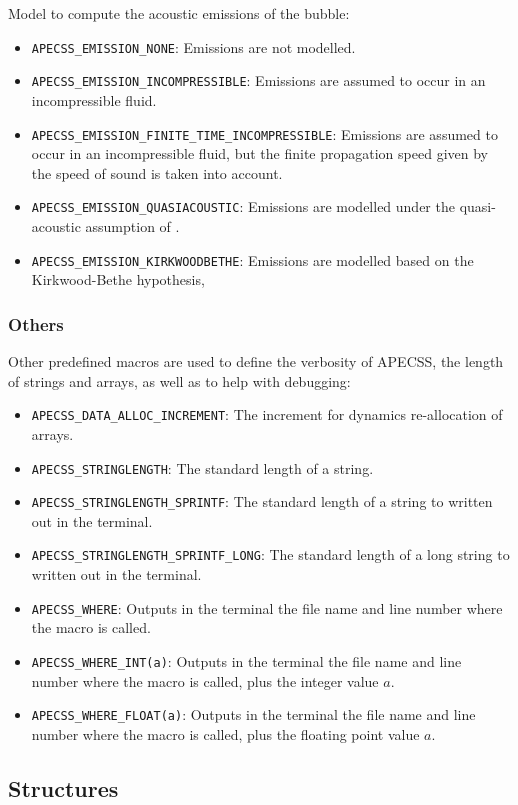 Model to compute the acoustic emissions of the bubble:\vspace{-1em}
\begin{itemize}[noitemsep]
  \item {\tt APECSS\_EMISSION\_NONE}: Emissions are not modelled.
  \item {\tt APECSS\_EMISSION\_INCOMPRESSIBLE}: Emissions are assumed to occur in an incompressible fluid.
  \item {\tt APECSS\_EMISSION\_FINITE\_TIME\_INCOMPRESSIBLE}: Emissions are assumed to occur in an incompressible fluid, but the finite propagation speed given by the speed of sound is taken into account.
  \item {\tt APECSS\_EMISSION\_QUASIACOUSTIC}: Emissions are modelled under the quasi-acoustic assumption of \citet{Gilmore1952}.
  \item {\tt APECSS\_EMISSION\_KIRKWOODBETHE}: Emissions are modelled based on the Kirkwood-Bethe hypothesis,
\end{itemize}


\subsubsection{Others}

Other predefined macros are used to define the verbosity of APECSS, the length of strings and arrays, as well as to help with debugging:\vspace{-1em}
\begin{itemize}[noitemsep]
  \item {\tt APECSS\_DATA\_ALLOC\_INCREMENT}: The increment for dynamics re-allocation of arrays.
  \item {\tt APECSS\_STRINGLENGTH}: The standard length of a string.
  \item {\tt APECSS\_STRINGLENGTH\_SPRINTF}: The standard length of a string to written out in the terminal.
  \item {\tt APECSS\_STRINGLENGTH\_SPRINTF\_LONG}: The standard length of a long string to written out in the terminal.
  \item {\tt APECSS\_WHERE}: Outputs in the terminal the file name and line number where the macro is called.
  \item {\tt APECSS\_WHERE\_INT(a)}: Outputs in the terminal the file name and line number where the macro is called, plus the integer value $a$.
  \item {\tt APECSS\_WHERE\_FLOAT(a)}: Outputs in the terminal the file name and line number where the macro is called, plus the floating point value $a$.
\end{itemize}


\subsection{Structures}

